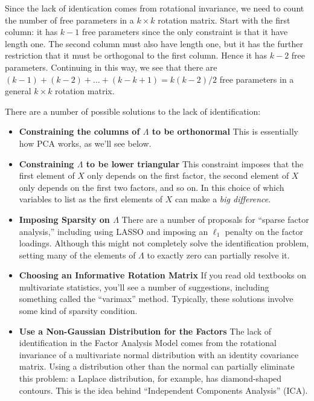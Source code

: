 \documentclass[12pt]{article}
\theoremstyle{definition}
\begin{document}
Since the lack of identication comes from rotational invariance, we need to count the number of free parameters in a $k\times k$ rotation matrix. Start with the first column: it has $k-1$ free parameters since the only constraint is that it have length one. The second column must also have length one, but it has the further restriction that it must be orthogonal to the first column. Hence it has $k - 2$ free parameters. Continuing in this way, we see that there are $(k - 1) + (k - 2) + \hdots + (k - k + 1) = k(k-2)/2$ free parameters in a general $k\times k$ rotation matrix. 

There are a number of possible solutions to the lack of identification:
	\begin{itemize}
		\item \textbf{Constraining the columns of $\Lambda$ to be orthonormal} This is essentially how PCA works, as we'll see below.
		\item \textbf{Constraining $\Lambda$ to be lower triangular} This constraint imposes that the first element of $X$ only depends on the first factor, the second element of $X$ only depends on the first two factors, and so on. In this choice of which variables to list as the first elements of $X$ can make a \emph{big difference}.
		\item \textbf{Imposing Sparsity on $\Lambda$} There are a number of proposals for ``sparse factor analysis,'' including using LASSO and imposing an $\ell_1$ penalty on the factor loadings. Although this might not completely solve the identification problem, setting many of the elements of $\Lambda$ to exactly zero can partially resolve it. 
		\item \textbf{Choosing an Informative Rotation Matrix} If you read old textbooks on multivariate statistics, you'll see a number of suggestions, including something called the ``varimax'' method. Typically, these solutions involve some kind of sparsity condition.
		\item \textbf{Use a Non-Gaussian Distribution for the Factors} The lack of identification in the Factor Analysis Model comes from the rotational invariance of a multivariate normal distribution with an identity covariance matrix. Using a distribution other than the normal can partially eliminate this problem: a Laplace distribution, for example, has diamond-shaped contours. This is the idea behind ``Independent Components Analysis'' (ICA).
	\end{itemize}
\end{document}
